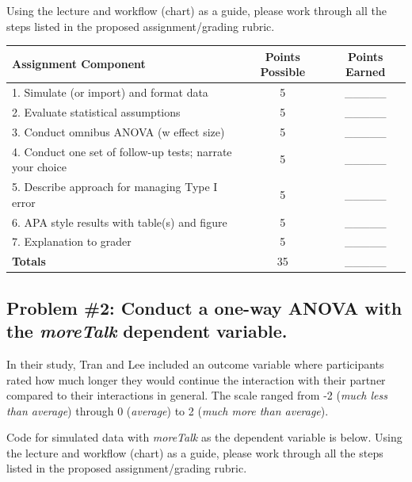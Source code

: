 \documentclass[
  english,
]{book}
\begin{document}
Using the lecture and workflow (chart) as a guide, please work through all the steps listed in the proposed assignment/grading rubric.

\begin{longtable}[]{@{}lcc@{}}
\toprule
Assignment Component & Points Possible & Points Earned \\
\midrule
\endhead
1. Simulate (or import) and format data & 5 & \_\_\_\_\_ \\
2. Evaluate statistical assumptions & 5 & \_\_\_\_\_ \\
3. Conduct omnibus ANOVA (w effect size) & 5 & \_\_\_\_\_ \\
4. Conduct one set of follow-up tests; narrate your choice & 5 & \_\_\_\_\_ \\
5. Describe approach for managing Type I error & 5 & \_\_\_\_\_ \\
6. APA style results with table(s) and figure & 5 & \_\_\_\_\_ \\
7. Explanation to grader & 5 & \_\_\_\_\_ \\
\textbf{Totals} & 35 & \_\_\_\_\_ \\
\bottomrule
\end{longtable}

\hypertarget{problem-2-conduct-a-one-way-anova-with-the-moretalk-dependent-variable.}{%
\subsection{\texorpdfstring{Problem \#2: Conduct a one-way ANOVA with the \emph{moreTalk} dependent variable.}{Problem \#2: Conduct a one-way ANOVA with the moreTalk dependent variable.}}\label{problem-2-conduct-a-one-way-anova-with-the-moretalk-dependent-variable.}}

In their study, Tran and Lee \citeyearpar{tran_you_2014} included an outcome variable where participants rated how much longer they would continue the interaction with their partner compared to their interactions in general. The scale ranged from -2 (\emph{much less than average}) through 0 (\emph{average}) to 2 (\emph{much more than average}).

Code for simulated data with \emph{moreTalk} as the dependent variable is below. Using the lecture and workflow (chart) as a guide, please work through all the steps listed in the proposed assignment/grading rubric.
\end{document}
